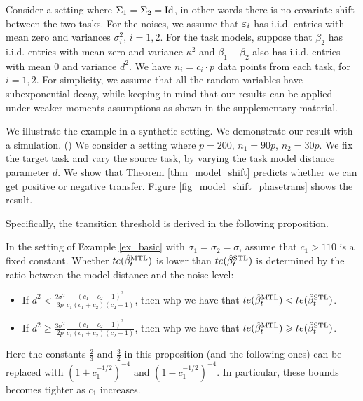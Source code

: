 \begin{example}\label{ex_basic}
	Consider a setting where $\Sigma_1 = \Sigma_2 = \operatorname{Id}$, in other words there is no covariate shift between the two tasks. For the noises, we assume that ${\varepsilon}_i$ has i.i.d. entries with mean zero and variances $\sigma_i^2$, $i=1,2$. 
	For the task models, suppose that $\beta_2$ has i.i.d. entries with mean zero and variance $\kappa^2$ and $\beta_1 - \beta_2$ also has i.i.d. entries with mean $0$ and variance $d^2$.
	We have $n_i = c_i \cdot p$ data points from each task, for $i = 1, 2$.
	For simplicity, we assume that all the random variables have subexponential decay, while keeping in mind that our results can be applied under weaker moments assumptions as shown in the supplementary material.
\end{example}

We illustrate the example in a synthetic setting.
We demonstrate our result with a simulation. ()
We consider a setting where $p = 200$, $n_1 = 90p$, $n_2 = 30p$.
We fix the target task and vary the source task, by varying the task model distance parameter $d$.
We show that Theorem \ref{thm_model_shift} predicts whether we can get positive or negative transfer.
Figure \ref{fig_model_shift_phasetrans} shows the result.

Specifically, the transition threshold is derived in the following proposition.
\begin{proposition}\label{prop_dist_transition}
	In the setting of Example \ref{ex_basic} with $\sigma_1 = \sigma_2 = \sigma$, assume that $c_1 > 110$ is a fixed constant.
	Whether $te(\hat{\beta}_t^{\text{MTL}})$ is lower than $te(\hat{\beta}_t^{\text{STL}})$ is determined by the ratio between the model distance and the noise level:
	\begin{itemize}
		\item If ${d^2} < \frac {2\sigma^2} {3p} \frac{(c_1 + c_2 -1)^2}{c_1 (c_1 + c_2)(c_2 - 1)}$, then whp we have that $te(\hat{\beta}_t^{\text{MTL}}) < te(\hat{\beta}_t^{\text{STL}})$.
		\item If ${d^2} \ge \frac {3\sigma^2} {2p} \frac{(c_1 + c_2 -1)^2}{c_1(c_1 + c_2)(c_2 - 1)} $, then whp we have that $te(\hat{\beta}_t^{\text{MTL}}) \geqslant te(\hat{\beta}_t^{\text{STL}})$.
	\end{itemize}
\end{proposition}

Here the constants $\frac23$ and $\frac32$ in this proposition (and the following ones) can be replaced with $(1+c_1^{-1/2})^{-4}$ and $(1-c_1^{-1/2})^{-4}$. In particular, these bounds becomes tighter as $c_1$ increases.

